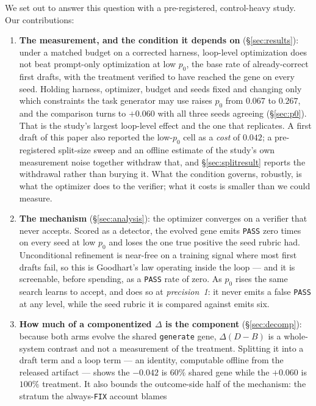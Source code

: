 \documentclass[11pt]{article}
\newcommand{\dd}{\ensuremath{\Delta}}
\begin{document}
We set out to answer this question with a pre-registered, control-heavy study. Our
contributions:
\begin{enumerate}
  \item \textbf{The measurement, and the condition it depends on} (\S\ref{sec:results}): under
    a matched budget on a corrected harness, loop-level optimization does not beat prompt-only
    optimization at low $p_0$, the base rate of already-correct first drafts, with the treatment
    verified to have reached the gene on every seed. Holding harness, optimizer, budget and
    seeds fixed and changing only which constraints the task generator may use raises $p_0$ from
    $0.067$ to $0.267$, and the comparison turns to $+0.060$ with all three seeds agreeing
    (\S\ref{sec:p0}). That is the study's largest loop-level effect and the one that replicates.
    A first draft of this paper also reported the low-$p_0$ cell as a \emph{cost} of $0.042$;
    a pre-registered split-size sweep and an offline estimate of the study's own measurement
    noise together withdraw that, and \S\ref{sec:splitresult} reports the withdrawal rather than
    burying it. What the condition governs, robustly, is what the optimizer does to the
    verifier; what it costs is smaller than we could measure.
  \item \textbf{The mechanism} (\S\ref{sec:analysis}): the optimizer converges on a verifier
    that never accepts. Scored as a detector, the evolved gene emits \texttt{PASS} zero times
    on every seed at low $p_0$ and loses the one true positive the seed rubric had.
    Unconditional refinement is near-free on a training signal where most first drafts fail,
    so this is Goodhart's law operating inside the loop --- and it is screenable, before
    spending, as a \texttt{PASS} rate of zero. As $p_0$ rises the same search learns to accept,
    and does so at \emph{precision~1}: it never emits a false \texttt{PASS} at any level, while
    the seed rubric it is compared against emits six.
  \item \textbf{How much of a componentized $\dd$ is the component} (\S\ref{sec:decomp}):
    because both arms evolve the shared \texttt{generate} gene, $\dd(D-B)$ is a whole-system
    contrast and not a measurement of the treatment. Splitting it into a draft term and a loop
    term --- an identity, computable offline from the released artifact --- shows the $-0.042$
    is $60\%$ shared gene while the $+0.060$ is $100\%$ treatment. It also bounds the
    outcome-side half of the mechanism: the stratum the always-\texttt{FIX} account blames

\end{enumerate}
\end{document}
